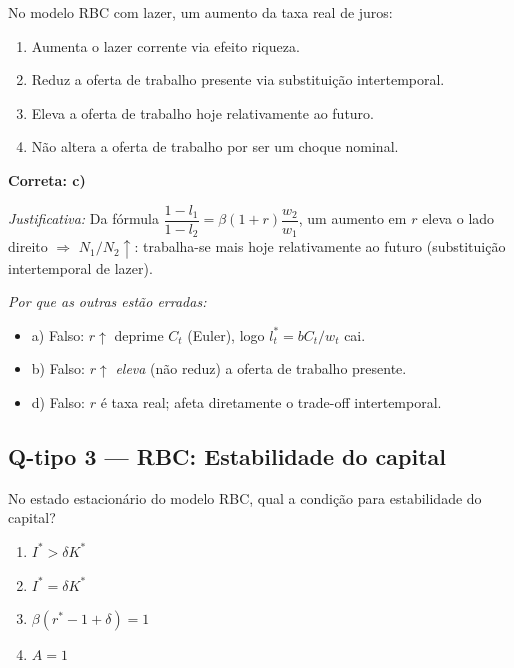 \documentclass[12pt, a4paper]{article}
\begin{document}
No modelo RBC com lazer, um aumento da taxa real de juros:

\begin{enumerate}[label=\textbf{\alph*)}, leftmargin=2em, itemsep=4pt]
  \item Aumenta o lazer corrente via efeito riqueza.
  \item Reduz a oferta de trabalho presente via substituição intertemporal.
  \item Eleva a oferta de trabalho hoje relativamente ao futuro.
  \item Não altera a oferta de trabalho por ser um choque nominal.
\end{enumerate}

\begin{resultbox}[title={Resposta Q-tipo 2: alternativa c)}]
\textbf{Correta: c)}

\textit{Justificativa:} Da fórmula $\dfrac{1-l_1}{1-l_2} = \beta(1+r)\dfrac{w_2}{w_1}$,
um aumento em $r$ eleva o lado direito $\Rightarrow$ $N_1/N_2\uparrow$: trabalha-se
mais hoje relativamente ao futuro (substituição intertemporal de lazer).

\textit{Por que as outras estão erradas:}
\begin{itemize}[leftmargin=1.5em, topsep=2pt, itemsep=2pt]
  \item a) Falso: $r\uparrow$ deprime $C_t$ (Euler), logo $l_t^*=bC_t/w_t$ cai.
  \item b) Falso: $r\uparrow$ \textit{eleva} (não reduz) a oferta de trabalho presente.
  \item d) Falso: $r$ é taxa real; afeta diretamente o trade-off intertemporal.
\end{itemize}
\end{resultbox}

\bigskip

\subsection*{Q-tipo 3 --- RBC: Estabilidade do capital}

No estado estacionário do modelo RBC, qual a condição para estabilidade do capital?

\begin{enumerate}[label=\textbf{\alph*)}, leftmargin=2em, itemsep=4pt]
  \item $I^* > \delta K^*$
  \item $I^* = \delta K^*$
  \item $\beta(r^* - 1 + \delta) = 1$
  \item $A = 1$
\end{enumerate}
\end{document}

